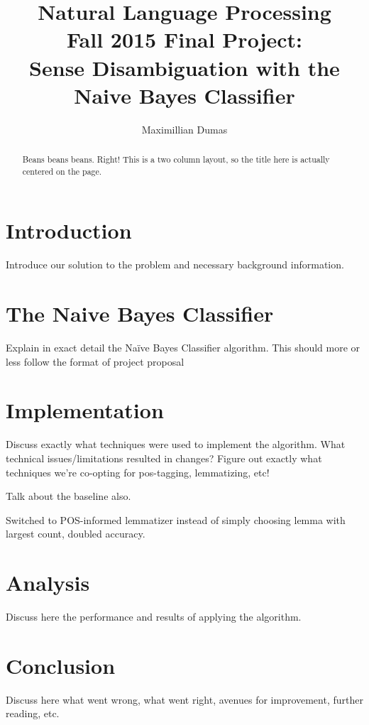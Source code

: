 \documentclass[11pt]{article}
\title{Natural Language Processing\\
Fall 2015 Final Project:\\
Sense Disambiguation with the\\
Naive Bayes Classifier}
\author{Maximillian Dumas}
\begin{document}
\maketitle

\begin{abstract}
Beans beans beans. Right! This is a two column layout, so the title here is actually centered on the page.
\end{abstract}

\section{Introduction}
Introduce our solution to the problem and necessary background information.

\section{The Naive Bayes Classifier}
Explain in exact detail the Naïve Bayes Classifier algorithm. This should more or less follow the format of project proposal

\section{Implementation}
Discuss exactly what techniques were used to implement the algorithm. What technical issues/limitations resulted in changes? Figure out exactly what techniques we're co-opting for pos-tagging, lemmatizing, etc!

Talk about the baseline also.

Switched to POS-informed lemmatizer instead of simply choosing lemma with largest count, doubled accuracy.

\section{Analysis}
Discuss here the performance and results of applying the algorithm.

\section{Conclusion}
Discuss here what went wrong, what went right, avenues for improvement, further reading, etc.
\end{document}
